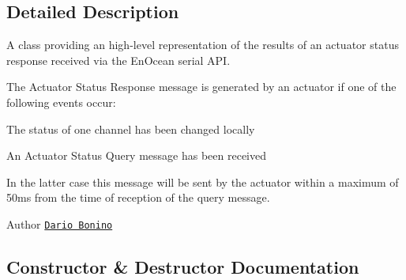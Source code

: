 \subsection{Detailed Description}
A class providing an high-\/level representation of the results of an actuator status response received via the En\+Ocean serial A\+PI.

The Actuator Status Response message is generated by an actuator if one of the following events occur\+: 
\begin{DoxyItemize}
\item The status of one channel has been changed locally 
\item An Actuator Status Query message has been received 
\end{DoxyItemize}

In the latter case this message will be sent by the actuator within a maximum of 50ms from the time of reception of the query message.

\begin{DoxyAuthor}{Author}
\href{mailto:dario.bonino@gmail.com}{\tt Dario Bonino} 
\end{DoxyAuthor}


\subsection{Constructor \& Destructor Documentation}
\hypertarget{classit_1_1polito_1_1elite_1_1enocean_1_1enj_1_1eep_1_1eep26_1_1_d2_1_1_d201_1_1_d201_actuator_status_response_aac9599b9ce44ed2b6a18e91df154c816}{}\label{classit_1_1polito_1_1elite_1_1enocean_1_1enj_1_1eep_1_1eep26_1_1_d2_1_1_d201_1_1_d201_actuator_status_response_aac9599b9ce44ed2b6a18e91df154c816} 
